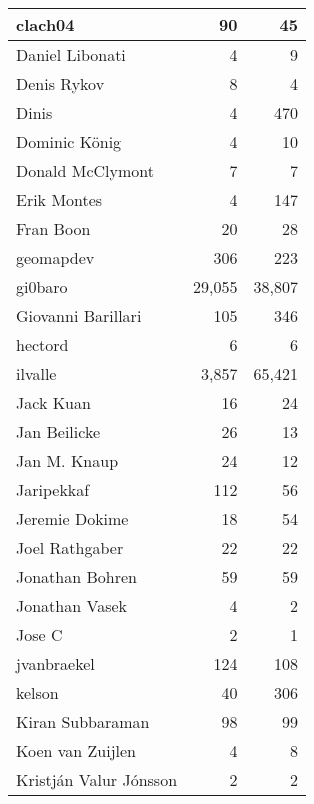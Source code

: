 \documentclass[a4paper,man,natbib,floatsintext]{apa6}
\begin{document}
\begin{table}[ht]
\begin{tabular}{|l|r|r|}
clach04                        & 90              & 45            \\ \hline
Daniel Libonati                & 4               & 9             \\ \hline
Denis Rykov                    & 8               & 4             \\ \hline
Dinis                          & 4               & 470           \\ \hline
Dominic König                  & 4               & 10            \\ \hline
Donald McClymont               & 7               & 7             \\ \hline
Erik Montes                    & 4               & 147           \\ \hline
Fran Boon                      & 20              & 28            \\ \hline
geomapdev                      & 306             & 223           \\ \hline
gi0baro                        & 29,055          & 38,807        \\ \hline
Giovanni Barillari             & 105             & 346           \\ \hline
hectord                        & 6               & 6             \\ \hline
ilvalle                        & 3,857           & 65,421        \\ \hline
Jack Kuan                      & 16              & 24            \\ \hline
Jan Beilicke                   & 26              & 13            \\ \hline
Jan M. Knaup                   & 24              & 12            \\ \hline
Jaripekkaf                     & 112             & 56            \\ \hline
Jeremie Dokime                 & 18              & 54            \\ \hline
Joel Rathgaber                 & 22              & 22            \\ \hline
Jonathan Bohren                & 59              & 59            \\ \hline
Jonathan Vasek                 & 4               & 2             \\ \hline
Jose C                         & 2               & 1             \\ \hline
jvanbraekel                    & 124             & 108           \\ \hline
kelson                         & 40              & 306           \\ \hline
Kiran Subbaraman               & 98              & 99            \\ \hline
Koen van Zuijlen               & 4               & 8             \\ \hline
Kristján Valur Jónsson         & 2               & 2             \\ \hline
\end{tabular}
\end{table}
\end{document}
